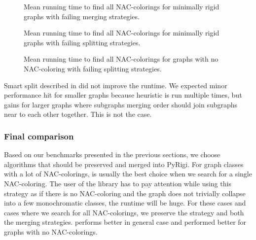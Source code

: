 \begin{figure}[p]
	\centering
	\scalebox{0.5}{}
	\caption[Mean runtime for minimally rigid graphs (some) (with failing).]{
		Mean running time to find all NAC-colorings for minimally rigid graphs with failing merging strategies.}%
	\label{fig:graph_mimimally_rigid_failing_merging_first_runtime}
\end{figure}%
\begin{figure}[p]
	\centering
	\scalebox{0.5}{}
	\caption[Mean runtime for minimally rigid graphs (some) (with failing).]{
		Mean running time to find all NAC-colorings for minimally rigid graphs with failing splitting strategies.}%
	\label{fig:graph_mimimally_rigid_failing_split_first_runtime}
\end{figure}%
\begin{figure}[p]
	\centering
	\scalebox{0.5}{}
	\caption[Mean runtime for graphs with no NAC-coloring (with failing).]{
		Mean running time to find all NAC-colorings for graphs with no NAC-coloring with failing splitting strategies.}%
	\label{fig:graph_no_nac_coloring_generated_rigid_failing_merging_first_runtime}
\end{figure}%

Smart split described in 
did not improve the runtime.
We expected minor performance hit for smaller graphs because heuristic is run
multiple times, but gains for larger graphs where subgraphs merging order
should join subgraphs near to each other together. This is not the case.

\subsubsection{Final comparison}

Based on our benchmarks presented in the previous sections,
we choose algorithms that should be preserved and merged into PyRigi.
For graph classes with a lot of NAC-colorings,
\NaiveCycles{} is usually the best choice
when we search for a single NAC-coloring.
The user of the library has to pay attention while using this strategy
as if there is no NAC-coloring and the graph does not trivially collapse
into a few monochromatic classes, the runtime will be huge.
For these cases and cases where we search for all NAC-colorings,
we preserve the \NeighborsDegree{} strategy and both the merging strategies.
\MergeLinear{} performs better in general case and
\SharedVertices{} performed better for graphs with no NAC-colorings.


